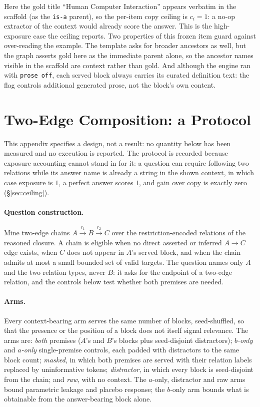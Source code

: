 \documentclass[10pt,twocolumn]{article}
\begin{document}
\noindent Here the gold title ``Human Computer Interaction'' appears verbatim in the scaffold
(as the \texttt{is-a} parent), so the per-item copy ceiling is $c_i=1$: a no-op extractor of the
context would already score the answer. This is the high-exposure case the ceiling reports.
Two properties of this frozen item guard against over-reading the example. The template asks for
broader ancestors as well, but the graph asserts gold here as the immediate parent alone, so the ancestor
names visible in the scaffold are context rather than gold. And although the engine ran with
\texttt{prose~off}, each served block always carries its curated definition text: the flag controls
additional generated prose, not the block's own content.

\section{Two-Edge Composition: a Protocol}\label{sec:appendix-composition}
This appendix specifies a design, not a result: no quantity below has been measured and no
execution is reported. The protocol is recorded because
exposure accounting cannot stand in for it: a question can require following two relations while
its answer name is already a string in the shown context, in which case exposure is $1$, a perfect
answer scores $1$, and gain over copy is exactly zero (\S\ref{sec:ceiling}).

\paragraph{Question construction.} Mine two-edge chains $A\xrightarrow{r_1}B\xrightarrow{r_2}C$ over
the restriction-encoded relations of the reasoned closure. A chain is eligible when no direct
asserted or inferred $A\to C$ edge exists, when $C$ does not appear in $A$'s served block, and when
the chain admits at most a small bounded set of valid targets. The question names only $A$ and the
two relation types, never $B$: it asks for the endpoint of a two-edge relation, and the controls below test whether both premises are needed.

\paragraph{Arms.} Every context-bearing arm serves the same number of blocks, seed-shuffled, so that
the presence or the position of a block does not itself signal relevance. The arms are: \emph{both}
premises ($A$'s and $B$'s blocks plus seed-disjoint distractors); \emph{$b$-only} and \emph{$a$-only}
single-premise controls, each padded with distractors to the same block count; \emph{masked}, in
which both premises are served with their relation labels replaced by uninformative tokens;
\emph{distractor}, in which every block is seed-disjoint from the chain; and \emph{raw}, with no
context. The $a$-only, distractor and raw arms bound parametric leakage and placebo response; the
$b$-only arm bounds what is obtainable from the answer-bearing block alone.
\end{document}

